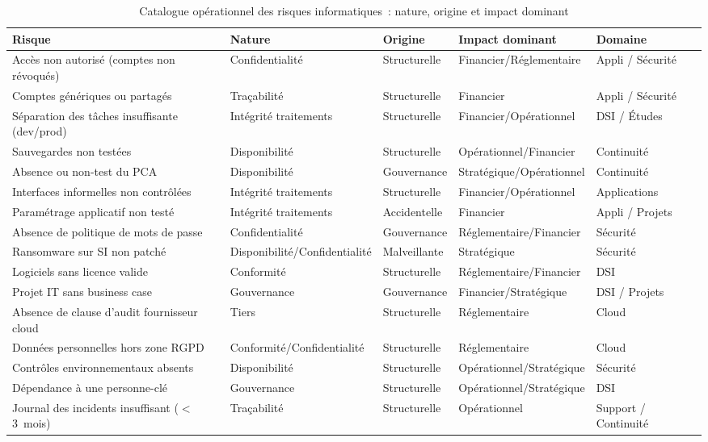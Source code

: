 \begin{table}[H]
\centering
\small
\renewcommand{\arraystretch}{1.4}
\caption{Catalogue opérationnel des risques informatiques~:
nature, origine et impact dominant}
\label{tab:catalogue-risques}
\begin{tabular}{|p{3.4cm}|p{2cm}|p{2cm}|p{2.2cm}|p{2.8cm}|}
    \hline
    \rowcolor{gray!20}
    \textbf{Risque} & \textbf{Nature} & \textbf{Origine} &
    \textbf{Impact dominant} & \textbf{Domaine} \\ \hline
    Accès non autorisé (comptes non révoqués) &
    Confidentialité & Structurelle & Financier/Réglementaire &
    Appli / Sécurité \\ \hline
    Comptes génériques ou partagés &
    Traçabilité & Structurelle & Financier &
    Appli / Sécurité \\ \hline
    Séparation des tâches insuffisante (dev/prod) &
    Intégrité traitements & Structurelle & Financier/Opérationnel &
    DSI / Études \\ \hline
    Sauvegardes non testées &
    Disponibilité & Structurelle & Opérationnel/Financier &
    Continuité \\ \hline
    Absence ou non-test du PCA &
    Disponibilité & Gouvernance & Stratégique/Opérationnel &
    Continuité \\ \hline
    Interfaces informelles non contrôlées &
    Intégrité traitements & Structurelle & Financier/Opérationnel &
    Applications \\ \hline
    Paramétrage applicatif non testé &
    Intégrité traitements & Accidentelle & Financier &
    Appli / Projets \\ \hline
    Absence de politique de mots de passe &
    Confidentialité & Gouvernance & Réglementaire/Financier &
    Sécurité \\ \hline
    Ransomware sur SI non patché &
    Disponibilité/Confidentialité & Malveillante & Stratégique &
    Sécurité \\ \hline
    Logiciels sans licence valide &
    Conformité & Structurelle & Réglementaire/Financier &
    DSI \\ \hline
    Projet IT sans business case &
    Gouvernance & Gouvernance & Financier/Stratégique &
    DSI / Projets \\ \hline
    Absence de clause d'audit fournisseur cloud &
    Tiers & Structurelle & Réglementaire &
    Cloud \\ \hline
    Données personnelles hors zone RGPD &
    Conformité/Confidentialité & Structurelle & Réglementaire &
    Cloud \\ \hline
    Contrôles environnementaux absents &
    Disponibilité & Structurelle & Opérationnel/Stratégique &
    Sécurité \\ \hline
    Dépendance à une personne-clé &
    Gouvernance & Structurelle & Opérationnel/Stratégique &
    DSI \\ \hline
    Journal des incidents insuffisant ($<$3~mois) &
    Traçabilité & Structurelle & Opérationnel &
    Support / Continuité \\ \hline
\end{tabular}
\end{table}

